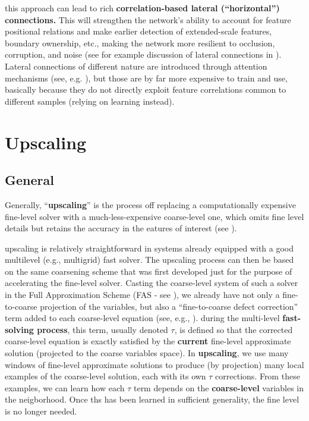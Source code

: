\documentclass{article} %
\begin{document}
this approach can lead to rich \textbf{correlation-based lateral (``horizontal'') connections.} This will strengthen the network's ability to account for feature positional relations and make earlier detection of extended-scale features, boundary ownership, etc., making the network more resilient to occlusion, corruption, and noise (see for example discussion of lateral connections in \cite{montobbio2019kercnns, spoerer}). Lateral connections of different nature are introduced through attention mechanisms (see, e.g. \cite{attention}), but those are by far more expensive to train and use, basically because they do not directly exploit feature correlations common to different samples (relying on learning instead).


\section{Upscaling}
\label{sec:upscaling}

\subsection{General}
\label{sec:upscaling_general}
Generally, ``\textbf{upscaling}'' is the process off replacing a computationally expensive fine-level solver with a much-less-expensive coarse-level one, which omits fine level details but retains the accuracy in the eatures of interest (see \cite{systematic_upscaling}).

upscaling is relatively straightforward in systems already equipped with a good multilevel (e.g., multigrid) fast solver. The upscaling process can then be based on the same coarsening scheme that was first developed just for the purpose of accelerating the fine-level solver. Casting the coarse-level system of such a solver in the Full Approximation Scheme (FAS - see \cite{brandt77}), we already have not only a fine-to-coarse projection of the variables, but also a ``fine-to-coarse defect correction'' term added to each coarse-level equation (see, e.g., \cite[Sec.~8.2]{guide}). during the multi-level \textbf{fast-solving process}, this term, usually denoted $\tau$, is defined so that the corrected coarse-level equation is exactly satisfied by the \textbf{current} fine-level approximate solution (projected to the coarse variables space). In \textbf{upscaling}, we use many windows of fine-level approximate solutions to produce (by projection) many local examples of the coarse-level solution, each with its own $\tau$ corrections. From these examples, we can learn how each $\tau$ term depends on the \textbf{coarse-level} variables in the neigborhood. Once ths has been learned in sufficient generality, the fine level is no longer needed.
\end{document}
